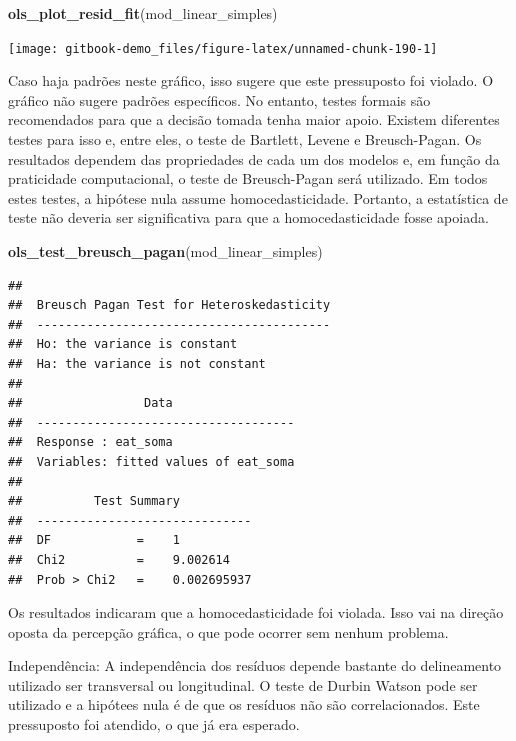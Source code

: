 \documentclass[
]{book}
\newenvironment{Shaded}{\begin{snugshade}}{\end{snugshade}}
\newcommand{\KeywordTok}[1]{\textcolor[rgb]{0.13,0.29,0.53}{\textbf{#1}}}
\newcommand{\NormalTok}[1]{#1}
\begin{document}
\begin{Shaded}
\begin{Highlighting}[]
\KeywordTok{ols_plot_resid_fit}\NormalTok{(mod_linear_simples)}
\end{Highlighting}
\end{Shaded}

\begin{center}\texttt{[image: gitbook-demo\_files/figure-latex/unnamed-chunk-190-1]} \end{center}

Caso haja padrões neste gráfico, isso sugere que este pressuposto foi
violado. O gráfico não sugere padrões específicos. No entanto, testes
formais são recomendados para que a decisão tomada tenha maior apoio.
Existem diferentes testes para isso e, entre eles, o teste de Bartlett,
Levene e Breusch-Pagan. Os resultados dependem das propriedades de cada
um dos modelos e, em função da praticidade computacional, o teste de
Breusch-Pagan será utilizado. Em todos estes testes, a hipótese nula
assume homocedasticidade. Portanto, a estatística de teste não deveria
ser significativa para que a homocedasticidade fosse apoiada.

\begin{Shaded}
\begin{Highlighting}[]
\KeywordTok{ols_test_breusch_pagan}\NormalTok{(mod_linear_simples)}
\end{Highlighting}
\end{Shaded}

\begin{verbatim}
## 
##  Breusch Pagan Test for Heteroskedasticity
##  -----------------------------------------
##  Ho: the variance is constant            
##  Ha: the variance is not constant        
## 
##                 Data                 
##  ------------------------------------
##  Response : eat_soma 
##  Variables: fitted values of eat_soma 
## 
##          Test Summary          
##  ------------------------------
##  DF            =    1 
##  Chi2          =    9.002614 
##  Prob > Chi2   =    0.002695937
\end{verbatim}

Os resultados indicaram que a homocedasticidade foi violada. Isso vai na
direção oposta da percepção gráfica, o que pode ocorrer sem nenhum
problema.

Independência: A independência dos resíduos depende bastante do
delineamento utilizado ser transversal ou longitudinal. O teste de
Durbin Watson pode ser utilizado e a hipótees nula é de que os resíduos
não são correlacionados. Este pressuposto foi atendido, o que já era
esperado.
\end{document}
